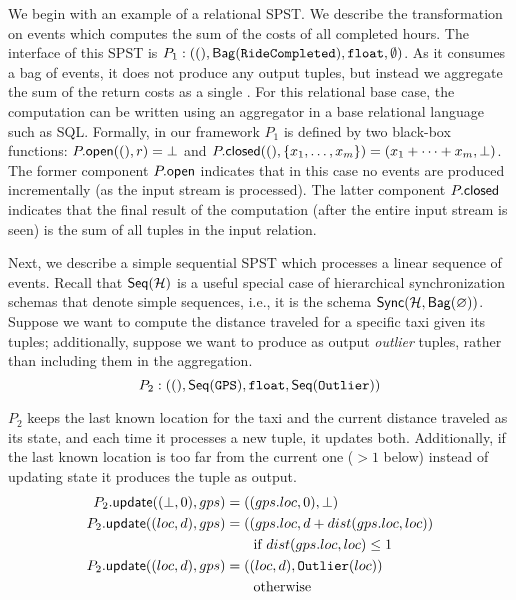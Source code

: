 We begin with an example of a relational SPST.
We describe the transformation on 
events which computes the sum of the costs of all completed hours.
The interface of this SPST is $
P_1: ((), \mathsf{Bag}({ \texttt{RideCompleted} }), \texttt{float}, \emptyset)$.
As it consumes a bag of  events,
it does not produce any output tuples, but instead we aggregate the sum of the return
costs as a single .
For this relational base case,
the computation can be written using an aggregator in a base relational language
such as SQL.
Formally, in our framework $P_1$ is defined by two black-box functions:
${P}.{\mathsf{open}}((), r) = \bot$
and ${P}.{\mathsf{closed}}((), \{x_1, \ldots, x_m\}) = (x_1 + \cdots + x_m, \bot)$.
The former component ${P}.{\mathsf{open}}$
indicates that in this case no events are produced incrementally
(as the input stream is processed).
The latter component ${P}.{\mathsf{closed}}$
indicates that the final result of the computation (after the entire input stream is seen)
is the sum of all tuples in the input relation.

Next, we describe a simple sequential SPST
which processes a linear sequence of 
events.
Recall that $\mathsf{Seq}({\mathcal{H}})$ is a useful special case of hierarchical synchronization schemas
that denote simple sequences, i.e., it is the schema $\mathsf{Sync}({\mathcal{H}}, \mathsf{Bag}({\varnothing}))$.
Suppose we want to compute the distance traveled for a specific taxi given its  tuples;
additionally,
suppose we want to produce as output \emph{outlier} 
tuples, rather than including them in the aggregation.
\[
P_2: ((),
    \mathsf{Seq}({ \texttt{GPS} }),
    \texttt{float},
    \mathsf{Seq}({ \texttt{Outlier} }))
\]


$P_2$ keeps the last known location for the taxi and the current distance traveled as its state, and each time it processes a new  tuple, it updates both.
Additionally, if the last known location is too far from the current one
($> 1$ below)
instead of updating state it produces the tuple as output.
\begin{align*}
{P_2}.{\mathsf{update}}((\bot, 0), gps)
    &= (( gps.loc, 0), \bot) \\
{P_2}.{\mathsf{update}}((loc, d), gps)
    &= (( gps.loc, d + dist(gps.loc, loc)) \\
    &\quad\quad\text{if } dist(gps.loc, loc) \le 1 \\
{P_2}.{\mathsf{update}}((loc, d), gps)
    &= (( loc, d), \texttt{Outlier}(loc)) \\
    &\quad\quad\text{otherwise}
\end{align*}

